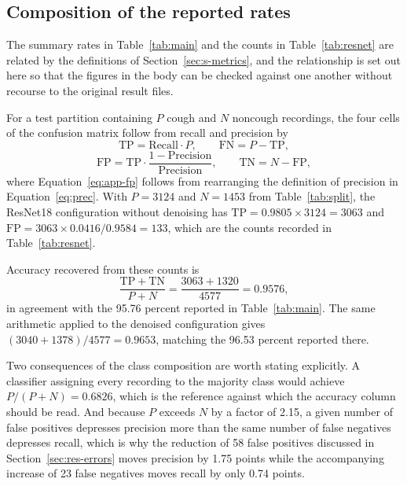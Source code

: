 \documentclass[pdflatex,sn-mathphys-num]{sn-jnl}
\begin{document}
\begin{appendices}

\section{Composition of the reported rates}\label{app:derivation}

The summary rates in Table~\ref{tab:main} and the counts in
Table~\ref{tab:resnet} are related by the definitions of
Section~\ref{sec:s-metrics}, and the relationship is set out here so that the
figures in the body can be checked against one another without recourse to the
original result files.

For a test partition containing $P$ cough and $N$ noncough recordings, the
four cells of the confusion matrix follow from recall and precision by
\begin{equation}
\mathrm{TP} = \mathrm{Recall} \cdot P, \qquad
\mathrm{FN} = P - \mathrm{TP},
\label{eq:app-tp}
\end{equation}
\begin{equation}
\mathrm{FP} = \mathrm{TP} \cdot
\frac{1 - \mathrm{Precision}}{\mathrm{Precision}}, \qquad
\mathrm{TN} = N - \mathrm{FP},
\label{eq:app-fp}
\end{equation}
where Equation~\eqref{eq:app-fp} follows from rearranging the definition of
precision in Equation~\eqref{eq:prec}. With $P = 3124$ and $N = 1453$ from
Table~\ref{tab:split}, the ResNet18 configuration without denoising has
$\mathrm{TP} = 0.9805 \times 3124 = 3063$ and
$\mathrm{FP} = 3063 \times 0.0416 / 0.9584 = 133$, which are the counts
recorded in Table~\ref{tab:resnet}.

Accuracy recovered from these counts is
\begin{equation}
\frac{\mathrm{TP} + \mathrm{TN}}{P + N}
= \frac{3063 + 1320}{4577} = 0.9576,
\label{eq:app-acc}
\end{equation}
in agreement with the 95.76 percent reported in Table~\ref{tab:main}. The
same arithmetic applied to the denoised configuration gives
$(3040 + 1378)/4577 = 0.9653$, matching the 96.53 percent reported there.

Two consequences of the class composition are worth stating explicitly. A
classifier assigning every recording to the majority class would achieve
$P/(P+N) = 0.6826$, which is the reference against which the accuracy column
should be read. And because $P$ exceeds $N$ by a factor of 2.15, a given
number of false positives depresses precision more than the same number of
false negatives depresses recall, which is why the reduction of 58 false
positives discussed in Section~\ref{sec:res-errors} moves precision by 1.75
points while the accompanying increase of 23 false negatives moves recall by
only 0.74 points.

\end{appendices}
\end{document}
